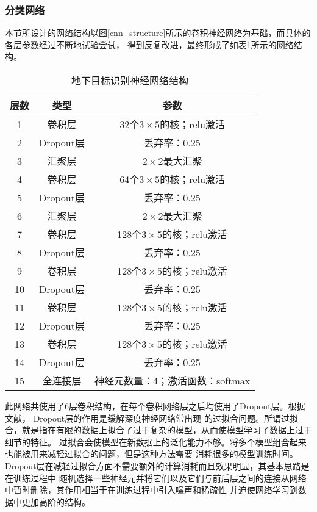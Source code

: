 \subsubsection{分类网络}
本节所设计的网络结构以图\ref{cnn_structure}所示的卷积神经网络为基础，而具体的各层参数经过不断地试验尝试，
得到反复改进，最终形成了如表\ref{table_network_structure}所示的网络结构。
\begin{table}[h]
	\caption{地下目标识别神经网络结构} 
	\begin{tabular}{|c|c|c|} 
		\hline  
		层数 &  类型 & 参数\\
		\hline 
		1 & 卷积层 & 32个$3\times 5$的核；relu激活\\  
		\hline  
		2 & Dropout层 & 丢弃率：0.25\\
		\hline
		3 & 汇聚层 & $2\times 2$最大汇聚\\
		\hline
		4 & 卷积层 & 64个$3\times 5$的核；relu激活\\  
		\hline  
		5 & Dropout层 & 丢弃率：0.25\\
		\hline
		6 & 汇聚层 & $2\times 2$最大汇聚\\
		\hline
		7 & 卷积层 & 128个$3\times 5$的核；relu激活\\
		\hline  
		8 & Dropout层 & 丢弃率：0.25\\
		\hline
		9 & 卷积层 & 128个$3\times 5$的核；relu激活\\
		\hline  
		10 & Dropout层 & 丢弃率：0.25\\
		\hline
		11 & 卷积层 & 128个$3\times 5$的核；relu激活\\
		\hline  
		12 & Dropout层 & 丢弃率：0.25\\
		\hline
		13 & 卷积层 & 128个$3\times 5$的核；relu激活\\
		\hline  
		14 & Dropout层 & 丢弃率：0.25\\
		\hline
		15 & 全连接层 & 神经元数量：4；激活函数：softmax\\
		\hline  
	\end{tabular}
	\label{table_network_structure}
\end{table}

此网络共使用了6层卷积结构，在每个卷积网络层之后均使用了Dropout层。根据文献\cite{srivastava2014dropout}，
Dropout层的作用是缓解深度神经网络常出现
的过拟合问题。所谓过拟合，就是指在有限的数据上拟合了过于复杂的模型，从而使模型学习了数据上过于细节的特征。
过拟合会使模型在新数据上的泛化能力不够。将多个模型组合起来也能被用来减轻过拟合的问题，但是这种方法需要
消耗很多的模型训练时间。Dropout层在减轻过拟合方面不需要额外的计算消耗而且效果明显，其基本思路是在训练过程中
随机选择一些神经元并将它们以及它们与前后层之间的连接从网络中暂时删除，其作用相当于在训练过程中引入噪声和稀疏性
并迫使网络学习到数据中更加高阶的结构。

